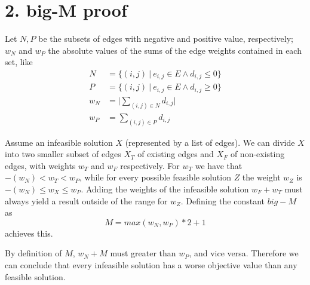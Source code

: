 
\section*{2. big-M proof}
Let $ N, P $ be the subsets of edges with negative and positive value, respectively; $ w_N $ and $ w_P $ the absolute values of the sums of the edge weights contained in each set, like
\begin{align*}
N &= \{(i,j) \: | \: e_{i,j} \in E \wedge d_{i,j} \leq 0 \} \\
P &= \{(i,j) \: | \: e_{i,j} \in E \wedge d_{i,j} \geq 0 \} \\
w_N &= \lvert \sum_{(i,j) \in N} d_{i,j} \rvert \\ 
w_P &= \sum_{(i,j) \in P} d_{i,j}  
\end{align*}

Assume an infeasible solution $ X $ (represented by a list of edges). We can divide $ X $ into two smaller subset of edges $ X_T $ of existing edges and $ X_F $ of non-existing edges, with weights $ w_T $ and $ w_F $ respectively. For $ w_T $ we have that $ -(w_N) < w_T < w_P $, while for every possible feasible solution $ Z $  the weight $ w_Z $ is $ -(w_N) \leq w_X \leq w_P $. Adding the weights of the infeasible solution $ w_F + w_T$ must always yield a result outside of the range for $ w_Z $. Defining the constant $ big-M $ as
$$\textit{M}= max( w_N , w_P ) * 2 + 1$$
achieves this. 

By definition of $M$,  $w_N + M$ must greater than $w_P$, and vice versa. Therefore we can conclude that every infeasible solution has a worse objective value than any feasible solution.